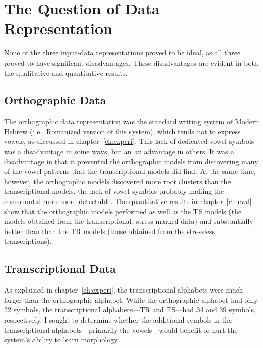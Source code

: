 \section{The Question of Data Representation}\label{sec:concl-data-rep}
None of the three input-data representations proved to be ideal, as 
all three proved to have significant disadvantages.
These disadvantages
are evident in both the qualitative and quantitative results.
\subsection{Orthographic Data}
The orthographic data representation was the standard writing system of Modern Hebrew
(i.e., Romanized version of this system), which tends not to express vowels,
as discussed in chapter~\ref{ch:experi}. This lack of dedicated vowel symbols was a disadvantage in some ways, but an an advantage in others. It was a disadvantage in that it
prevented the orthographic models from discovering many of the vowel patterns that the transcriptional models
did find. 
At the same time, however, the orthographic models discovered more root clusters than the transcriptional models, the lack of vowel symbols probably making the consonantal roots more detectable. 
The quantitative results in chapter~\ref{ch:eval} show that the orthographic models performed 
as well as the TS models (the models obtained from the transcriptional, stress-marked data) and substantially better than
than the TR models (those obtained from the stressless transcriptions).

\subsection{Transcriptional Data} \label{sec:concl-trans-data}
As explained in chapter~\ref{ch:experi}, the transcriptional alphabets were much larger than the orthographic alphabet.
While the orthographic alphabet had only 22 symbols, the transcriptional alphabets---TR and TS---had 34 and 39 symbols, respectively. 
I sought to determine whether the additional symbols in the transcriptional alphabets---primarily the vowels---would benefit or hurt the system's ability to learn morphology.


